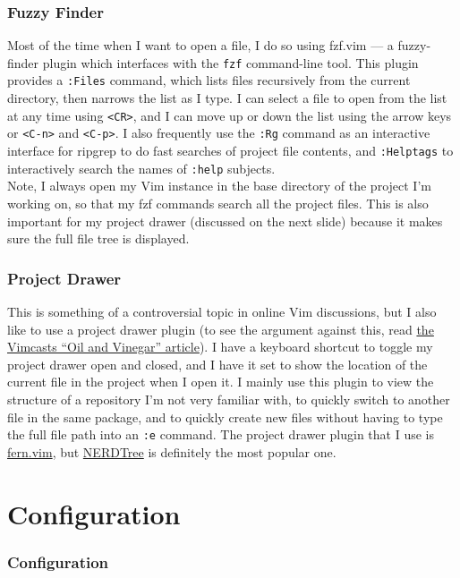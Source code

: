 \documentclass{beamer}
\begin{document}
\begin{frame}[fragile]
	\frametitle{Fuzzy Finder}
	\small
	Most of the time when I want to open a file, I do so using fzf.vim --- a fuzzy-finder plugin which interfaces with the \verb+fzf+ command-line tool. This plugin provides a \verb+:Files+ command, which lists files recursively from the current directory, then narrows the list as I type. I can select a file to open from the list at any time using \verb+<CR>+, and I can move up or down the list using the arrow keys or \verb+<C-n>+ and \verb+<C-p>+. I also frequently use the \verb+:Rg+ command as an interactive interface for ripgrep to do fast searches of project file contents, and \verb+:Helptags+ to interactively search the names of \verb+:help+ subjects.\\
	\vspace{0.5cm}
	Note, I always open my Vim instance in the base directory of the project I'm working on, so that my fzf commands search all the project files. This is also important for my project drawer (discussed on the next slide) because it makes sure the full file tree is displayed.
\end{frame}

\begin{frame}[fragile]
	\frametitle{Project Drawer}
	\small
	This is something of a controversial topic in online Vim discussions, but I also like to use a project drawer plugin (to see the argument against this, read \href{http://vimcasts.org/blog/2013/01/oil-and-vinegar-split-windows-and-project-drawer/}{the Vimcasts ``Oil and Vinegar'' article}). I have a keyboard shortcut to toggle my project drawer open and closed, and I have it set to show the location of the current file in the project when I open it. I mainly use this plugin to view the structure of a repository I'm not very familiar with, to quickly switch to another file in the same package, and to quickly create new files without having to type the full file path into an \verb+:e+ command. The project drawer plugin that I use is \href{https://github.com/lambdalisue/fern.vim}{fern.vim}, but \href{https://github.com/preservim/nerdtree}{NERDTree} is definitely the most popular one.
\end{frame}

\section{Configuration}

\begin{frame}[fragile]
    \frametitle{Configuration}
    \tableofcontents[currentsection]
\end{frame}
\end{document}
